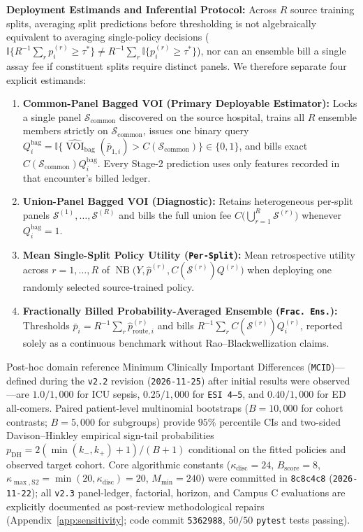 \documentclass[11pt]{article}
\begin{document}
\textbf{Deployment Estimands and Inferential Protocol:} Across $R$ source training splits, averaging split predictions before thresholding is not algebraically equivalent to averaging single-policy decisions ($\mathbb{I}\{R^{-1}\sum_r p_i^{(r)} \ge \tau^*\} \ne R^{-1}\sum_r \mathbb{I}\{p_i^{(r)} \ge \tau^*\}$), nor can an ensemble bill a single assay fee if constituent splits require distinct panels. We therefore separate four explicit estimands:
\begin{enumerate}
  \item \textbf{Common-Panel Bagged VOI (Primary Deployable Estimator):} Locks a single panel $\mathcal{S}_{\text{common}}$ discovered on the source hospital, trains all $R$ ensemble members strictly on $\mathcal{S}_{\text{common}}$, issues one binary query $Q_i^{\text{bag}} = \mathbb{I}\{\widehat{\operatorname{VOI}}_{\text{bag}}(\bar{p}_{1,i}) > C(\mathcal{S}_{\text{common}})\} \in \{0,1\}$, and bills exact $C(\mathcal{S}_{\text{common}})Q_i^{\text{bag}}$. Every Stage-2 prediction uses only features recorded in that encounter's billed ledger.
  \item \textbf{Union-Panel Bagged VOI (Diagnostic):} Retains heterogeneous per-split panels $\mathcal{S}^{(1)}, \dots, \mathcal{S}^{(R)}$ and bills the full union fee $C\big(\bigcup_{r=1}^R \mathcal{S}^{(r)}\big)$ whenever $Q_i^{\text{bag}}=1$.
  \item \textbf{Mean Single-Split Policy Utility (\texttt{Per-Split}):} Mean retrospective utility across $r=1,\dots,R$ of $\operatorname{NB}\big(Y, \hat{p}^{(r)}, C(\mathcal{S}^{(r)})Q^{(r)}\big)$ when deploying one randomly selected source-trained policy.
  \item \textbf{Fractionally Billed Probability-Averaged Ensemble (\texttt{Frac.\ Ens.}):} Thresholds $\bar{p}_i = R^{-1}\sum_r \hat{p}_{\text{route},i}^{(r)}$ and bills $R^{-1}\sum_r C(\mathcal{S}^{(r)})Q_i^{(r)}$, reported solely as a continuous benchmark without Rao--Blackwellization claims.
\end{enumerate}
Post-hoc domain reference Minimum Clinically Important Differences (\texttt{MCID})---defined during the \texttt{v2.2} revision (\texttt{2026-11-25}) after initial results were observed---are $1.0/1{,}000$ for ICU sepsis, $0.25/1{,}000$ for \texttt{ESI 4--5}, and $0.40/1{,}000$ for ED all-comers. Paired patient-level multinomial bootstraps ($B=10{,}000$ for cohort contrasts; $B=5{,}000$ for subgroups) provide $95\%$ percentile CIs and two-sided Davison--Hinkley empirical sign-tail probabilities $p_{\text{DH}} = 2(\min(k_-,k_+)+1)/(B+1)$ \citep{davison1997bootstrap} conditional on the fitted policies and observed target cohort. Core algorithmic constants ($\kappa_{\text{disc}}=24$, $B_{\text{score}}=8$, $\kappa_{\max,\text{S2}}=\min(20,\kappa_{\text{disc}})=20$, $M_{\min}=240$) were committed in \texttt{8c8c4c8} (\texttt{2026-11-22}); all \texttt{v2.3} panel-ledger, factorial, horizon, and Campus C evaluations are explicitly documented as post-review methodological repairs (Appendix~\ref{app:sensitivity}; code commit \texttt{5362988}, $50/50$ \texttt{pytest} tests passing).
\end{document}
